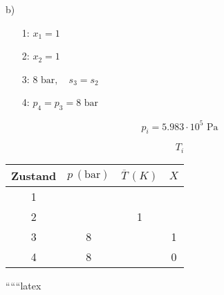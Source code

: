 b)

\begin{itemize}
    \item[1:] $x_1 = 1$
    \item[2:] $x_2 = 1$
    \item[3:] $8 \text{ bar}, \quad s_3 = s_2$
    \item[4:] $p_4 = p_3 = 8 \text{ bar}$
\end{itemize}

\[
p_i = 5.983 \cdot 10^5 \text{ Pa}
\]

\[
T_i
\]

\begin{tabular}{|c|c|c|c|}
\hline
Zustand & $p \, (\text{bar})$ & $\overline{T} \, (K)$ & $X$ \\
\hline
1 & & & \\
\hline
2 & & 1 & \\
\hline
3 & 8 & & 1 \\
\hline
4 & 8 & & 0 \\
\hline
\end{tabular}

``````latex